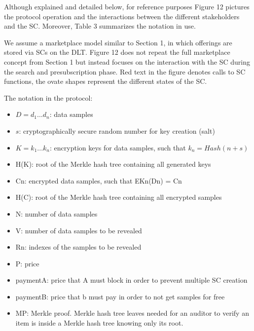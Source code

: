 \documentclass[]{article}
\begin{document}
	Although explained and detailed below, for reference purposes Figure 12 pictures the protocol operation and the interactions between the different stakeholders and the SC. Moreover, Table 3 summarizes the notation in use.

	We assume a marketplace model similar to Section 1, in which offerings are stored via SCs on the DLT. Figure 12 does not repeat the full marketplace concept from Section 1 but instead focuses on the interaction with the SC during the search and presubscription phase. Red text in the figure denotes calls to SC functions, the ovate shapes represent the different states of the SC.

	The notation in the protocol:
	\begin{itemize}
		\item $D = d_1 ... d_n$: data samples
		\item $s$: cryptographically secure random number for key creation (salt)
		\item $K = k_1 ... k_n$: encryption keys for data samples, such that $k_n = Hash(n + s)$
		\item H(K): root of the Merkle hash tree containing all generated keys
		\item Cn: encrypted data samples, such that EKn(Dn) = Cn
		\item H(C): root of the Merkle hash tree containing all encrypted samples
		\item N: number of data samples
		\item V: number of data samples to be revealed
		\item Rn: indexes of the samples to be revealed
		\item P: price
		\item paymentA: price that A must block in order to prevent multiple SC creation
		\item paymentB: price that b must pay in order to not get samples for free
		\item MP: Merkle proof. Merkle hash tree leaves needed for an auditor to verify an item is inside a Merkle hash tree knowing only its root.
	\end{itemize}
\end{document}
